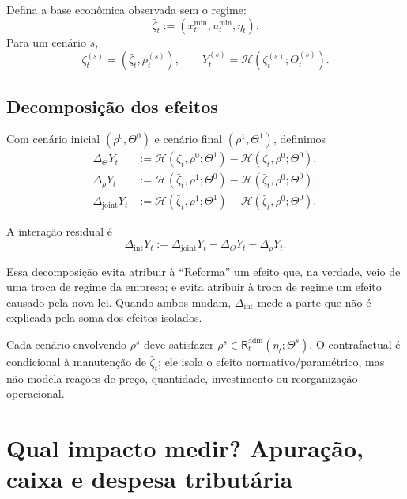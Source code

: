 \documentclass[11pt,a4paper]{article}
\newcommand{\cH}{\mathcal{H}}
\begin{document}
Defina a base econômica observada sem o regime:
\begin{equation}
\boxed{
\bar\zeta_t:=(x_t^{\min},u_t^{\min},\eta_t).
}
\end{equation}
Para um cenário $s$,
\begin{equation}
\zeta_t^{(s)}=(\bar\zeta_t,\rho_t^{(s)}),
\qquad
Y_t^{(s)}=\cH(\zeta_t^{(s)};\Theta_t^{(s)}).
\end{equation}

\subsection{Decomposição dos efeitos}

Com cenário inicial $(\rho^0,\Theta^0)$ e cenário final $(\rho^1,\Theta^1)$, definimos
\begin{align}
\Delta_{\Theta}Y_t
&:=\cH(\bar\zeta_t,\rho^0;\Theta^1)
   -\cH(\bar\zeta_t,\rho^0;\Theta^0),\\
\Delta_{\rho}Y_t
&:=\cH(\bar\zeta_t,\rho^1;\Theta^0)
   -\cH(\bar\zeta_t,\rho^0;\Theta^0),\\
\Delta_{\mathrm{joint}}Y_t
&:=\cH(\bar\zeta_t,\rho^1;\Theta^1)
   -\cH(\bar\zeta_t,\rho^0;\Theta^0).
\end{align}

A interação residual é
\begin{equation}
\boxed{
\Delta_{\mathrm{int}}Y_t
:=\Delta_{\mathrm{joint}}Y_t
 -\Delta_{\Theta}Y_t
 -\Delta_{\rho}Y_t.
}
\label{eq:interaction}
\end{equation}

\begin{intuicao}
Essa decomposição evita atribuir à ``Reforma'' um efeito que, na verdade, veio de uma troca de regime da empresa; e evita atribuir à troca de regime um efeito causado pela nova lei. Quando ambos mudam, $\Delta_{\mathrm{int}}$ mede a parte que não é explicada pela soma dos efeitos isolados.
\end{intuicao}

\begin{cuidado}
Cada cenário envolvendo $\rho^s$ deve satisfazer $\rho^s\in\mathsf R_t^{\mathrm{adm}}(\eta_t;\Theta^s)$. O contrafactual é condicional à manutenção de $\bar\zeta_t$; ele isola o efeito normativo/paramétrico, mas não modela reações de preço, quantidade, investimento ou reorganização operacional.
\end{cuidado}

\section{Qual impacto medir? Apuração, caixa e despesa tributária}
\end{document}
